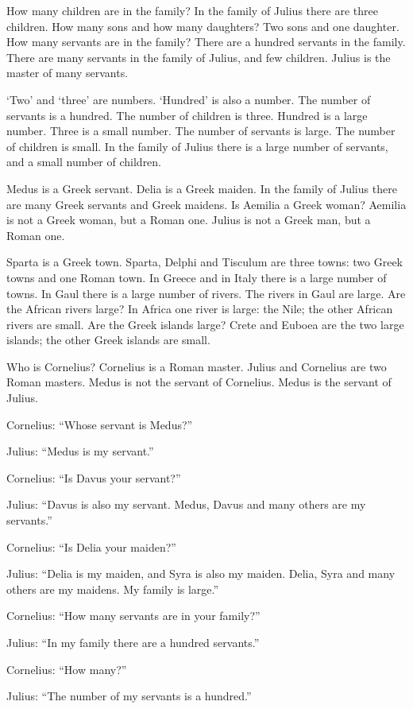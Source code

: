 How many children are in the family? In the family of Julius there are three children. How many sons and how many daughters? Two sons and one daughter. How many servants are in the family? There are a hundred servants in the family. There are many servants in the family of Julius, and few children. Julius is the master of many servants.

`Two' and `three' are numbers. `Hundred' is also a number. The number of servants is a hundred. The number of children is three. Hundred is a large number. Three is a small number. The number of servants is large. The number of children is small. In the family of Julius there is a large number of servants, and a small number of children.

Medus is a Greek servant. Delia is a Greek maiden. In the family of Julius there are many Greek servants and Greek maidens. Is Aemilia a Greek woman? Aemilia is not a Greek woman, but a Roman one. Julius is not a Greek man, but a Roman one.

Sparta is a Greek town. Sparta, Delphi and Tisculum are three towns: two Greek towns and one Roman town. In Greece and in Italy there is a large number of towns. In Gaul there is a large number of rivers. The rivers in Gaul are large. Are the African rivers large? In Africa one river is large: the Nile; the other African rivers are small. Are the Greek islands large? Crete and Euboea are the two large islands; the other Greek islands are small.

Who is Cornelius? Cornelius is a Roman master. Julius and Cornelius are two Roman masters. Medus is not the servant of Cornelius. Medus is the servant of Julius.

Cornelius: ``Whose servant is Medus?''

Julius: ``Medus is my servant.''

Cornelius: ``Is Davus your servant?''

Julius: ``Davus is also my servant. Medus, Davus and many others are my servants.''

Cornelius: ``Is Delia your maiden?''

Julius: ``Delia is my maiden, and Syra is also my maiden. Delia, Syra and many others are my maidens. My family is large.''

Cornelius: ``How many servants are in your family?''

Julius: ``In my family there are a hundred servants.''

Cornelius: ``How many?''

Julius: ``The number of my servants is a hundred.''

